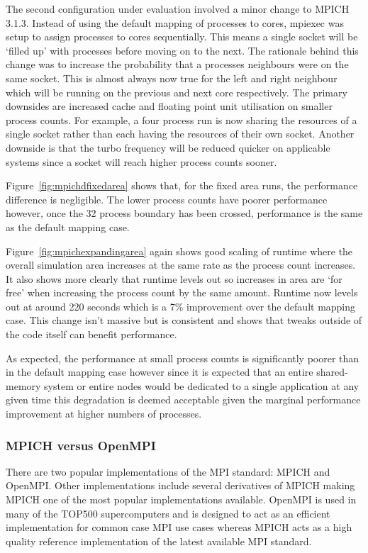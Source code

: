 The second configuration under evaluation involved a minor change to MPICH
3.1.3. Instead of using the default mapping of processes to cores, mpiexec was
setup to assign processes to cores sequentially. This means a single socket will
be `filled up' with processes before moving on to the next. The rationale behind
this change was to increase the probability that a processes neighbours were on
the same socket. This is almost always now true for the left and right neighbour
which will be running on the previous and next core respectively. The primary
downsides are increased cache and floating point unit utilisation on smaller
process counts. For example, a four process run is now sharing the resources of
a single socket rather than each having the resources of their own socket.
Another downside is that the turbo frequency will be reduced quicker on
applicable systems since a socket will reach higher process counts sooner.

Figure~\ref{fig:mpichdfixedarea} shows that, for the fixed area runs, the
performance difference is negligible. The lower process counts have poorer
performance however, once the 32 process boundary has been crossed, performance
is the same as the default mapping case.

Figure~\ref{fig:mpichexpandingarea} again shows good scaling of
runtime where the overall simulation area increases at the same rate as the
process count increases. It also shows more clearly that runtime levels out so
increases in area are `for free' when increasing the process count by the same
amount. Runtime now levels out at around 220 seconds which is a 7\% improvement
over the default mapping case. This change isn't massive but is consistent and
shows that tweaks outside of the code itself can benefit performance.

As expected, the performance at small process counts is significantly poorer
than in the default mapping case however since it is expected that an entire
shared-memory system or entire nodes would be dedicated to a single application
at any given time this degradation is deemed acceptable given the marginal
performance improvement at higher numbers of processes.

\subsubsection{MPICH versus OpenMPI}

There are two popular implementations of the MPI standard: MPICH and OpenMPI.
Other implementations include several derivatives of MPICH making MPICH one of
the most popular implementations available. OpenMPI is used in many of the
TOP500 supercomputers and is designed to act as an efficient implementation for
common case MPI use cases whereas MPICH acts as a high quality reference
implementation of the latest available MPI standard.

